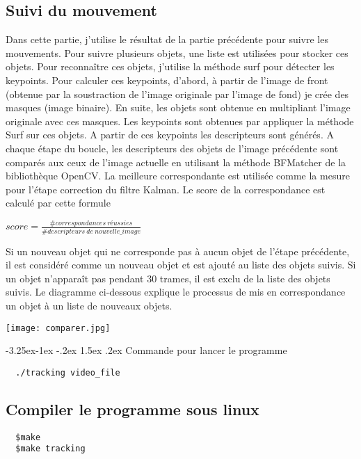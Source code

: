 \documentclass[french,12pt,a4paper,oneside,notitlepage]{report}
\makeatletter
\let\LaTeX@startsection\@startsection
\renewcommand{\@startsection}[6]{\LaTeX@startsection%
{#1}{#2}{#3}{#4}{#5}{\color{bl}\raggedright #6}}
\renewcommand\paragraph{\@startsection{paragraph}{4}{\z@}%
  {-3.25ex\@plus -1ex \@minus -.2ex}%
  {1.5ex \@plus .2ex}%
  {\normalfont\normalsize\bfseries}}
\makeatother
\begin{document}
\subsection{Suivi du mouvement}
Dans cette partie, j'utilise le résultat de la partie précédente pour suivre les 
mouvements. Pour suivre plusieurs objets, une liste est utilisées pour stocker ces 
objets. Pour reconnaître ces objets, j'utilise la méthode surf pour détecter les 
keypoints. Pour calculer ces keypoints, d'abord, à partir de l'image de front (obtenue 
par la soustraction de l'image originale par l'image de fond) je crée des masques (image 
binaire). En suite, les objets sont obtenue en multipliant  l'image originale 
avec ces masques. Les keypoints sont obtenues par appliquer la méthode Surf sur 
ces objets. A partir de ces keypoints les descripteurs sont générés. A chaque étape du 
boucle, les descripteurs des objets de l'image précédente sont comparés aux ceux de 
l'image actuelle en utilisant la méthode BFMatcher de la bibliothèque OpenCV. La meilleure 
correspondante est utilisée comme la mesure pour l'étape correction du filtre Kalman. Le 
score de la correspondance est calculé par cette formule
\begin{center}
 $score = \frac{\#  correspondances\ réussies}{\# descripteurs\ de\ nouvelle\_image}$
\end{center}

Si un nouveau objet qui ne corresponde pas à aucun 
objet de l'étape précédente, il est considéré comme un nouveau objet et est ajouté au 
liste des objets suivis. Si un objet n'apparaît pas pendant 30 trames, il est exclu de la 
liste des objets suivis. Le diagramme ci-dessous explique le processus de mis en 
correspondance un objet à un liste de nouveaux objets.
\begin{center}
\texttt{[image: comparer.jpg]}
\end{center}
\paragraph{Commande pour lancer le programme}
\begin{lstlisting}
  ./tracking video_file 
\end{lstlisting}
\subsection{Compiler le programme sous linux}
\begin{lstlisting}
  $make 
  $make tracking 
\end{lstlisting}
\clearpage
\end{document}
